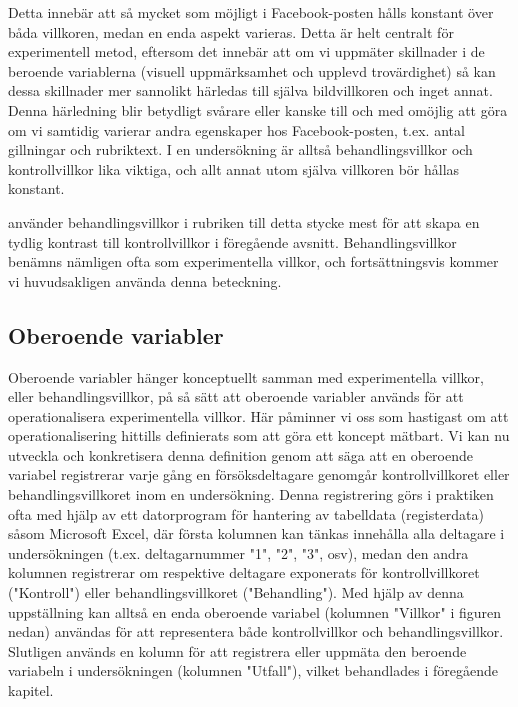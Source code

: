 \documentclass[
]{book}
\begin{document}
Detta innebär att så mycket som möjligt i Facebook-posten hålls konstant över båda villkoren, medan en enda aspekt varieras. Detta är helt centralt för experimentell metod, eftersom det innebär att om vi uppmäter skillnader i de beroende variablerna (visuell uppmärksamhet och upplevd trovärdighet) så kan dessa skillnader mer sannolikt härledas till själva bildvillkoren och inget annat. Denna härledning blir betydligt svårare eller kanske till och med omöjlig att göra om vi samtidig varierar andra egenskaper hos Facebook-posten, t.ex. antal gillningar och rubriktext. I en undersökning är alltså behandlingsvillkor och kontrollvillkor lika viktiga, och allt annat utom själva villkoren bör hållas konstant.

använder behandlingsvillkor i rubriken till detta stycke mest för att skapa en tydlig kontrast till kontrollvillkor i föregående avsnitt. Behandlingsvillkor benämns nämligen ofta som experimentella villkor, och fortsättningsvis kommer vi huvudsakligen använda denna beteckning.

\hypertarget{sub07.4.2}{%
\subsection{Oberoende variabler}\label{sub07.4.2}}

Oberoende variabler hänger konceptuellt samman med experimentella villkor, eller behandlingsvillkor, på så sätt att oberoende variabler används för att operationalisera experimentella villkor. Här påminner vi oss som hastigast om att operationalisering hittills definierats som att göra ett koncept mätbart. Vi kan nu utveckla och konkretisera denna definition genom att säga att en oberoende variabel registrerar varje gång en försöksdeltagare genomgår kontrollvillkoret eller behandlingsvillkoret inom en undersökning. Denna registrering görs i praktiken ofta med hjälp av ett datorprogram för hantering av tabelldata (registerdata) såsom Microsoft Excel, där första kolumnen kan tänkas innehålla alla deltagare i undersökningen (t.ex. deltagarnummer "1", "2", "3", osv), medan den andra kolumnen registrerar om respektive deltagare exponerats för kontrollvillkoret ("Kontroll") eller behandlingsvillkoret ("Behandling"). Med hjälp av denna uppställning kan alltså en enda oberoende variabel (kolumnen "Villkor" i figuren nedan) användas för att representera både kontrollvillkor och behandlingsvillkor. Slutligen används en kolumn för att registrera eller uppmäta den beroende variabeln i undersökningen (kolumnen "Utfall"), vilket behandlades i föregående kapitel.
\end{document}
